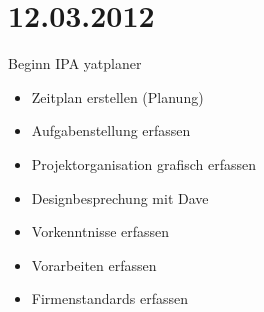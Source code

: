 \section{12.03.2012}
Beginn IPA yatplaner
\begin{itemize}
    \item Zeitplan erstellen (Planung)
    \item Aufgabenstellung erfassen
    \item Projektorganisation grafisch erfassen
    \item Designbesprechung mit Dave
    \item Vorkenntnisse erfassen
    \item Vorarbeiten erfassen
    \item Firmenstandards erfassen
\end{itemize}